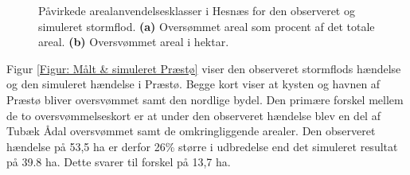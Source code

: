 \begin{figure}[H]
\begin{subfigure}[b]{0.5\textwidth}
        \caption{}
        \label{Subfig: Hektar Hesnæs}
    \end{subfigure}
    \caption{Påvirkede arealanvendelsesklasser i Hesnæs for den observeret og simuleret stormflod. \textbf{(a)} Oversømmet areal som procent af det totale areal. \textbf{(b)} Oversvømmet areal i hektar.}
    \label{Figur: Påvirket arealanvendelse Hesnæs}
\end{figure}


Figur \ref{Figur: Målt & simuleret Præstø} viser den observeret stormflods hændelse og den simuleret hændelse i Præstø. Begge kort viser at kysten og havnen af Præstø bliver oversvømmet samt den nordlige bydel. Den primære forskel mellem de to oversvømmelseskort er at under den observeret hændelse blev en del af Tubæk Ådal oversvømmet samt de omkringliggende arealer. Den observeret hændelse på 53,5 ha er derfor 26\% større i udbredelse end det simuleret resultat på 39.8 ha. Dette svarer til forskel på 13,7 ha. 

